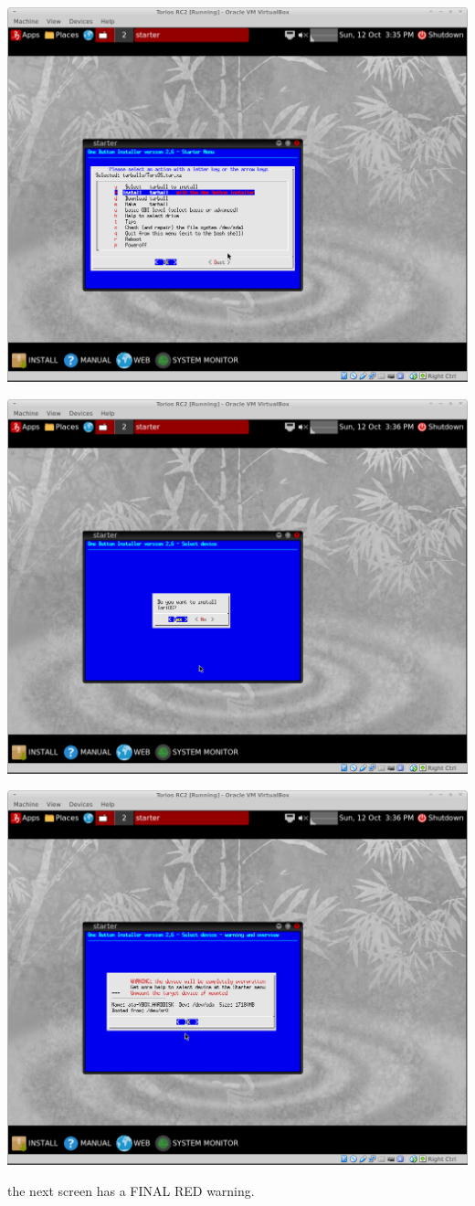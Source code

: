 \documentclass[12pt,a4paper]{book}
\begin{document}
\includegraphics[width=0.7\linewidth]{torios-rc2-install4}

\includegraphics[width=0.7\linewidth]{torios-rc2-install5}

\includegraphics[width=0.7\linewidth]{torios-rc2-install6}


the next screen has a FINAL RED warning. \\ 
\end{document}
